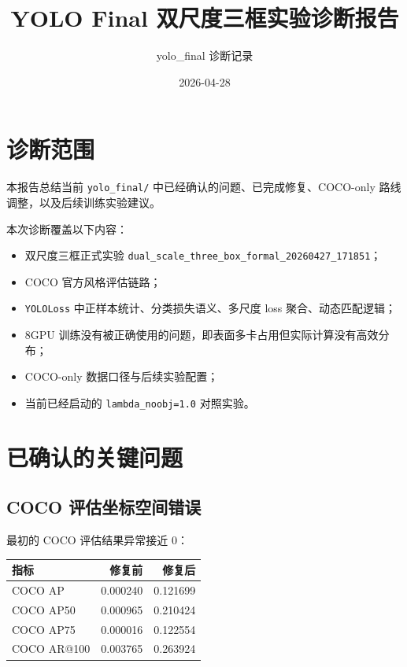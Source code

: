 \documentclass[UTF8]{ctexart}
\title{YOLO Final 双尺度三框实验诊断报告}
\author{yolo\_final 诊断记录}
\date{2026-04-28}
\begin{document}
\maketitle

\section{诊断范围}

本报告总结当前 \texttt{yolo\_final/} 中已经确认的问题、已完成修复、COCO-only 路线调整，以及后续训练实验建议。

本次诊断覆盖以下内容：

\begin{itemize}[leftmargin=2em]
  \item 双尺度三框正式实验 \texttt{dual\_scale\_three\_box\_formal\_20260427\_171851}；
  \item COCO 官方风格评估链路；
  \item \texttt{YOLOLoss} 中正样本统计、分类损失语义、多尺度 loss 聚合、动态匹配逻辑；
  \item 8GPU 训练没有被正确使用的问题，即表面多卡占用但实际计算没有高效分布；
  \item COCO-only 数据口径与后续实验配置；
  \item 当前已经启动的 \texttt{lambda\_noobj=1.0} 对照实验。
\end{itemize}

\section{已确认的关键问题}

\subsection{COCO 评估坐标空间错误}

最初的 COCO 评估结果异常接近 0：

\begin{center}
\begin{tabular}{lrr}
\toprule
指标 & 修复前 & 修复后 \\
\midrule
COCO AP & 0.000240 & 0.121699 \\
COCO AP50 & 0.000965 & 0.210424 \\
COCO AP75 & 0.000016 & 0.122554 \\
COCO AR@100 & 0.003765 & 0.263924 \\
\bottomrule
\end{tabular}
\end{center}
\end{document}
